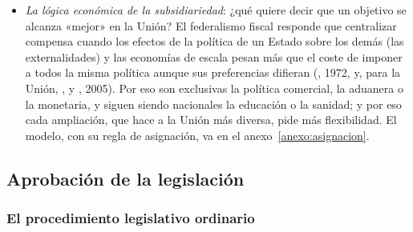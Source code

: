 \documentclass[11pt]{article}
\begin{document}
\begin{itemize}
\item \emph{La lógica económica de la subsidiariedad}: ¿qué quiere decir que un objetivo se alcanza «mejor» en la Unión? El federalismo fiscal responde que centralizar compensa cuando los efectos de la política de un Estado sobre los demás (las externalidades) y las economías de escala pesan más que el coste de imponer a todos la misma política aunque sus preferencias difieran (, 1972, y, para la Unión, ,  y , 2005). Por eso son exclusivas la política comercial, la aduanera o la monetaria, y siguen siendo nacionales la educación o la sanidad; y por eso cada ampliación, que hace a la Unión más diversa, pide más flexibilidad. El modelo, con su regla de asignación, va en el anexo~\ref{anexo:asignacion}.
\end{itemize}

\subsection{Aprobación de la legislación}\label{sec:legislacion}

\subsubsection{El procedimiento legislativo ordinario}\label{sec:plo}
\end{document}
